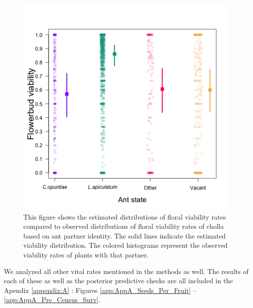 \documentclass[11pt]{article}
\begin{document}
\begin{figure}[H]
	\includegraphics[width=0.95\linewidth]{Figures/Viab_v2.png}
	\caption{This figure shows the estimated distributions of floral viability rates compared to observed distributions of floral viability rates of cholla based on ant partner identity. The solid lines indicate the estimated viability distribution. The colored histograms represent the observed viability rates of plants with that partner. }
	\label{fig:Viab}
\end{figure}

We analyzed all other vital rates mentioned in the methods as well.
The results of each of these as well as the posterior predictive checks are all included in the Apendix \ref{appendix:A} : Figures \ref{app:AppA_Seeds_Per_Fruit} -- \ref{app:AppA_Pre_Census_Surv}.
\end{document}

